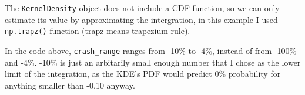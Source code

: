 The \texttt{KernelDensity} object does not include a CDF function, so we can only estimate its value by approximating the intergration, in this example I used \texttt{np.trapz()} function (trapz means trapezium rule).

In the code above, \texttt{crash\_range} ranges from -10\% to -4\%, instead of from -100\% and -4\%. -10\% is just an arbitarily small enough number that I chose as the lower limit of the integration, as the KDE's PDF would predict 0\% probability for anything smaller than -0.10 anyway.
